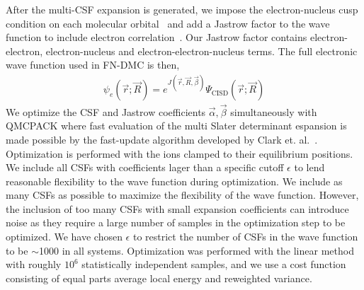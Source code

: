 \documentclass[pra,superscriptaddress,groupedaddress,twocolumn]{revtex4}
\begin{document}
After the multi-CSF expansion is generated, we impose the electron-nucleus cusp condition on each molecular orbital~\cite{cusp} and add a Jastrow factor to the wave function to include electron correlation~\cite{Kato}. Our Jastrow factor contains electron-electron, electron-nucleus and electron-electron-nucleus terms. The full electronic wave function used in FN-DMC is then,
\begin{align}
\psi_e(\vec{r};\vec{R})=e^{J(\vec{r},\vec{R},\vec{\beta})}\Psi_{\text{CISD}}(\vec{r};\vec{R})\label{eq:psie}
\end{align}
We optimize the CSF and Jastrow coefficients $\vec{\alpha},\vec{\beta}$ simultaneously with QMCPACK \cite{QMCPACK} where fast evaluation of the multi Slater determinant espansion is made possible by the fast-update algorithm developed by Clark et. al.~\cite{Clark_Bench}. Optimization is performed with the ions clamped to their equilibrium positions. We include all CSFs with coefficients lager than a specific cutoff $\epsilon$ to lend reasonable flexibility to the wave function during optimization. We include as many CSFs as possible to maximize the flexibility of the wave function. However, the inclusion of too many CSFs with small expansion coefficients can introduce noise as they require a large number of samples in the optimization step to be optimized. We have chosen $\epsilon$ to restrict the number of CSFs in the wave function to be $\sim$1000 in all systems. Optimization was performed with the linear method with roughly $10^6$ statistically independent samples, and we use a cost function consisting of equal parts average local energy and reweighted variance. 

%
\end{document}
